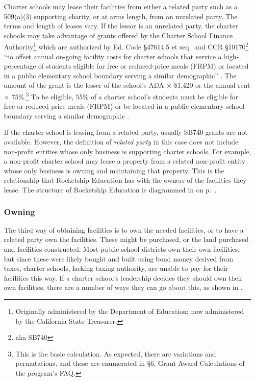 Charter schools may lease their facilities from either a related party such as a 509(a)(3) supporting charity, or at arms length, from an unrelated party. The terms and length of leases vary. If the lessor is an unrelated party, the charter schools may take advantage of grants offered by the Charter School Finance Authority\footnote{Originally administered by the Department of Education; now administered by the California State Treasurer.} which are authorized by Ed. Code §47614.5 et seq. and CCR §10170\footnote{aka SB740} ``to offset annual on-going facility costs for charter schools that service a high-percentage of students eligible for free or reduced-price meals (FRPM) or located in a public elementary school boundary serving a similar demographic'' \parencite{CATreasurer2023}. The amount of the grant is the lesser of the school's ADA × \$1,420 or the annual rent × 75\%.\footnote{This is the basic calculation. As expected, there are variations and permutations, and these are enumerated in §6, Grant Award Calculations of the program's FAQ\@.} To be eligible, 55\% of a charter school's students must be eligible for free or reduced-price meals (FRPM) or be located in a public elementary school boundary serving a similar demographic \parencite[§1]{CATreasurer2023}.

If the charter school is leasing from a related party, usually SB740 grants are not available. However, the definition of \emph{related party} in this case does not include non-profit entities whose only business is supporting charter schools. For example, a non-profit charter school may lease a property from a related non-profit entity whose only business is owning and maintaining that property. This is the relationship that Rocketship Education has with the owners of the facilities they lease. The structure of Rocketship Education is diagrammed in  on p.~\pageref{fig:corporate-structure}.

\subsubsection{Owning}\label{sec:owning}%

The third way of obtaining facilities is to own the needed facilities, or to have a related party own the facilities. These might be purchased, or the land purchased and facilities constructed. Most public school districts own their own facilities, but since these were likely bought and built using bond money derived from taxes, charter schools, lacking taxing authority, are unable to pay for their facilities this way.
If a charter school's leadership decides they should own their own facilities, there are a number of ways they can go about this, as shown in .

